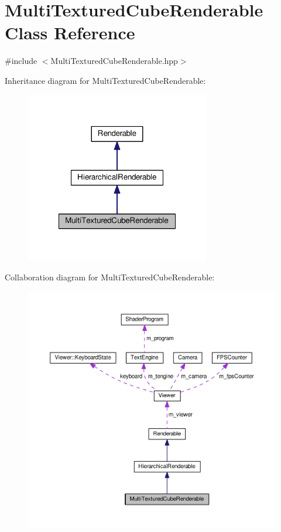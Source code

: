 \hypertarget{classMultiTexturedCubeRenderable}{\section{Multi\+Textured\+Cube\+Renderable Class Reference}
\label{classMultiTexturedCubeRenderable}
}


{\ttfamily \#include $<$Multi\+Textured\+Cube\+Renderable.\+hpp$>$}



Inheritance diagram for Multi\+Textured\+Cube\+Renderable\+:\nopagebreak
\begin{figure}[H]
\begin{center}
\leavevmode
\includegraphics[width=228pt]{classMultiTexturedCubeRenderable__inherit__graph}
\end{center}
\end{figure}


Collaboration diagram for Multi\+Textured\+Cube\+Renderable\+:\nopagebreak
\begin{figure}[H]
\begin{center}
\leavevmode
\includegraphics[width=350pt]{classMultiTexturedCubeRenderable__coll__graph}
\end{center}
\end{figure}
